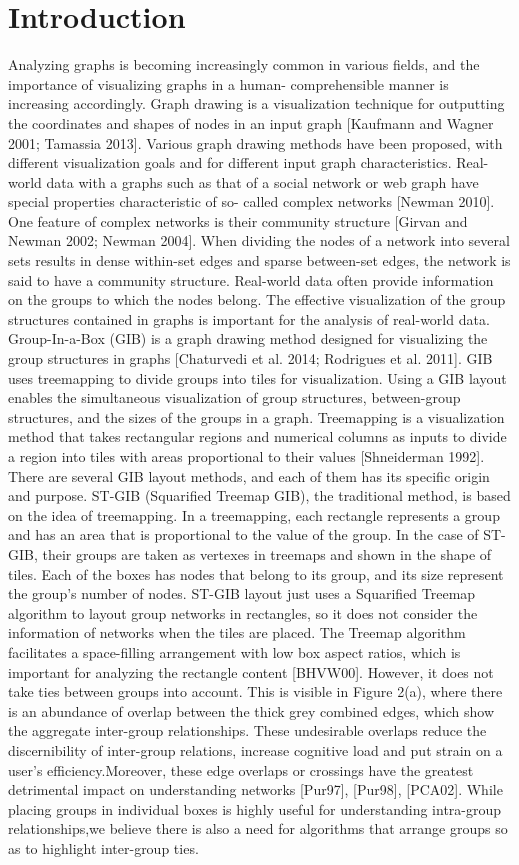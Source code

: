 \documentclass{llncs}
\begin{document}
\section{Introduction}
%
Analyzing graphs is becoming increasingly common in various fields, and the importance of visualizing graphs in a human- comprehensible manner is increasing accordingly. Graph drawing is a visualization technique for outputting the coordinates and shapes of nodes in an input graph [Kaufmann and Wagner 2001; Tamassia 2013]. Various graph drawing methods have been proposed, with different visualization goals and for different input graph characteristics. Real-world data with a graphs such as that of a social network or web graph have special properties characteristic of so- called complex networks [Newman 2010]. One feature of complex networks is their community structure [Girvan and Newman 2002; Newman 2004]. When dividing the nodes of a network into several sets results in dense within-set edges and sparse between-set edges, the network is said to have a community structure. Real-world data often provide information on the groups to which the nodes belong. The effective visualization of the group structures contained in graphs is important for the analysis of real-world data. Group-In-a-Box (GIB) is a graph drawing method designed for visualizing the group structures in graphs [Chaturvedi et al. 2014; Rodrigues et al. 2011]. GIB uses treemapping to divide groups into tiles for visualization. Using a GIB layout enables the simultaneous visualization of group structures, between-group structures, and the sizes of the groups in a graph. Treemapping is a visualization method that takes rectangular regions and numerical columns as inputs to divide a region into tiles with areas proportional to their values [Shneiderman 1992]. There are several GIB layout methods, and each of them has its specific origin and purpose. ST-GIB (Squarified Treemap GIB), the traditional method, is based on the idea of treemapping. In a treemapping, each rectangle represents a group and has an area that is proportional to the value of the group. In the case of ST-GIB, their groups are taken as vertexes in treemaps and shown in the shape of tiles. Each of the boxes has nodes that belong to its group, and its size represent the group's number of nodes. ST-GIB layout just uses a Squarified Treemap algorithm to layout group networks in rectangles, so it does not consider the information of networks when the tiles are placed. The Treemap algorithm facilitates a space-filling arrangement with low box aspect ratios, which is important for analyzing the rectangle content [BHVW00]. However, it does not take ties between groups into account. This is visible in Figure 2(a), where there is an abundance of overlap between the thick grey combined edges, which show the aggregate inter-group relationships. These undesirable overlaps reduce the discernibility of inter-group relations, increase cognitive load and put strain on a user’s efficiency.Moreover, these edge overlaps or crossings have the greatest detrimental impact on understanding networks [Pur97], [Pur98], [PCA02]. While placing groups in individual boxes is highly useful for understanding intra-group relationships,we believe there is also a need for algorithms that arrange groups so as to highlight inter-group ties.
\end{document}
